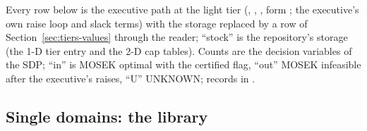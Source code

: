 Every row below is the executive path at the light tier (, , , form ; the executive's own raise loop and slack terms) with the storage replaced by a row of Section~\ref{sec:tiers-values} through the reader; ``stock'' is the repository's storage (the 1-D tier entry and the 2-D cap tables). Counts are the decision variables of the SDP; ``in'' is MOSEK optimal with the certified flag, ``out'' MOSEK infeasible after the executive's raises, ``U'' UNKNOWN; records in .

\subsection{Single domains: the library}\label{sec:bl-lib}


